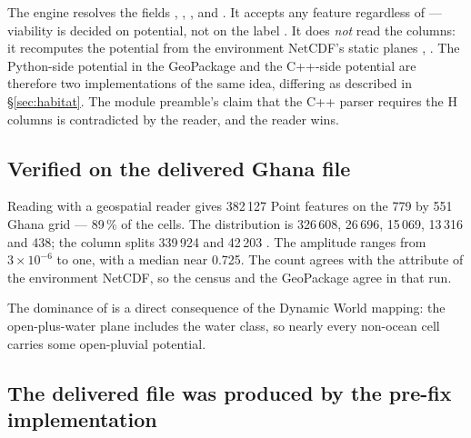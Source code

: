 \documentclass[11pt,a4paper]{article} \usepackage[utf8]{inputenc} \usepackage{lmodern} \usepackage[T1]{fontenc}
\begin{document}
The engine resolves the fields , , ,
 and  . It
accepts any feature regardless of  --- viability is decided on potential, not on
the label . It does \emph{not}
read the  columns: it recomputes the potential from the environment NetCDF's
static planes ,
. The
Python-side potential in the GeoPackage and the C++-side potential are therefore two
implementations of the same idea, differing as described in \S\ref{sec:habitat}. The module
preamble's claim that the C++ parser requires the H columns
 is contradicted by the reader, and the reader
wins.

\subsection{Verified on the delivered Ghana file}

Reading  with a geospatial reader gives 382\,127
Point features on the 779 by 551 Ghana grid --- 89\,\% of the cells. The 
distribution is  326\,608,  26\,696,
 15\,069,  13\,316 and 
438; the  column splits 339\,924  and 42\,203 .
The amplitude ranges from $3\times10^{-6}$ to one, with a median near 0.725. The count agrees
with the  attribute of the environment NetCDF, so the census and the
GeoPackage agree in that run.

The dominance of  is a direct consequence of the Dynamic World mapping: the
open-plus-water plane includes the water class, so nearly every non-ocean cell carries some
open-pluvial potential.

\subsection{The delivered file was produced by the pre-fix implementation}
\end{document}
